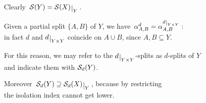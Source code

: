 \documentclass[./main.tex]{subfiles}
\begin{document}
\begin{remark}
    Clearly $\, \Sc(Y) = \restr{\Sc(X)}{Y} \,$. \vspace{-3pt}
    
    Given a partial split $\{A,B\}$ of $Y$, we have $\, \aAB^d = \aAB^{\restr{d}{\YY}} \,$: \\[3pt]
    \bsp in fact $d$ and $\restr{d}{\YY}$ coincide on $A \cup B$, since $A,B \subseteq Y$.
    
    For this reason, we may refer to the $\restr{d}{\YY}$-splits as $d$-splits of $Y$ \\
    \bsp and indicate them with ${\mathcal{S}}_d(Y)$.

    Moreover $\, \Sc_d(Y) \supseteq \restr{\Sc_d(X)}{Y} \,$, because by restricting \\[2pt]
    \bsp the isolation index cannot get lower.
\end{remark}


\end{document}
